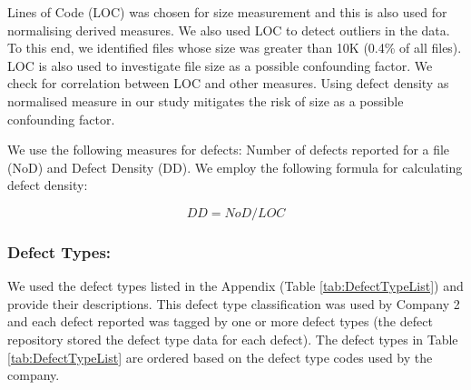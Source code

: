 \documentclass[times]{smrauth}
\begin{document}
Lines of Code (LOC) was chosen for size measurement and this is also used for normalising derived measures. We also used LOC to detect outliers in the data. To this end, we identified files whose size was greater than 10K (0.4\% of all files). LOC is also used to investigate file size as a possible confounding factor. We check for correlation between LOC and other measures. Using defect density as normalised measure in our study mitigates the risk of size as a possible confounding factor.



We use the following measures for defects: Number of  defects reported for a file (NoD) and Defect Density (DD). We employ the following formula for calculating defect density:

 \[
  DD = NoD / LOC 
 \]
 

\subsubsection{Defect Types:}

We used the defect types listed in the Appendix (Table \ref{tab:DefectTypeList}) and provide their descriptions. 
This defect type classification was used by Company 2 and each defect reported was tagged by one or more defect types (the defect repository stored the defect type data for each defect). The defect types in Table \ref{tab:DefectTypeList} are ordered based on the defect type codes used by the company.

\end{document}
